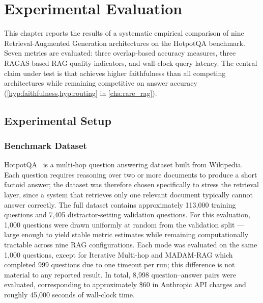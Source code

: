 \chapter{Experimental Evaluation}
\label{cha:evaluation}

This chapter reports the results of a systematic empirical comparison of nine
Retrieval-Augmented Generation architectures on the HotpotQA benchmark.
Seven metrics are evaluated: three overlap-based accuracy measures,
three RAGAS-based RAG-quality indicators, and wall-clock query latency.
The central claim under test is that \rarerag{} achieves higher faithfulness than
all competing architectures while remaining competitive on answer accuracy
(\cref{hyp:faithfulness,hyp:routing} in
\cref{cha:rare_rag}).

\section{Experimental Setup}
\label{sec:exp_setup}

\subsection{Benchmark Dataset}

HotpotQA~\cite{yang2018hotpotqa} is a multi-hop question answering dataset built
from Wikipedia.
Each question requires reasoning over two or more documents to produce a short
factoid answer; the dataset was therefore chosen specifically to stress the
retrieval layer, since a system that retrieves only one relevant document typically
cannot answer correctly.
The full dataset contains approximately 113{,}000 training questions and
7{,}405 distractor-setting validation questions.
For this evaluation, 1{,}000 questions were drawn uniformly at random from
the validation split --- large enough to yield stable metric estimates while
remaining computationally tractable across nine RAG configurations.
Each mode was evaluated on the same 1{,}000 questions, except for Iterative
Multi-hop and MADAM-RAG which completed 999 questions due to one timeout
per run; this difference is not material to any reported result.
In total, 8{,}998 question--answer pairs were evaluated, corresponding to
approximately \$60 in Anthropic API charges and roughly 45{,}000 seconds of
wall-clock time.

